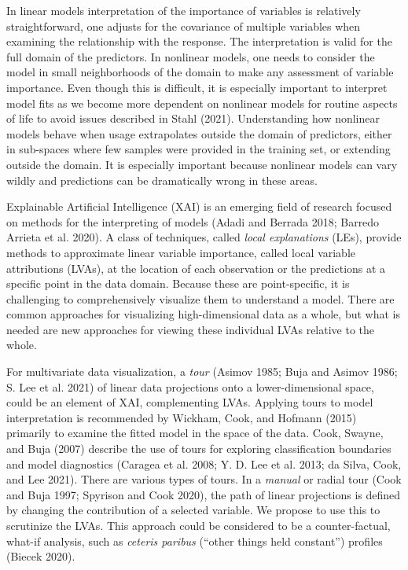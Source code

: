 \documentclass[
]{article}
\begin{document}
In linear models interpretation of the importance of variables is relatively straightforward, one adjusts for the covariance of multiple variables when examining the relationship with the response. The interpretation is valid for the full domain of the predictors. In nonlinear models, one needs to consider the model in small neighborhoods of the domain to make any assessment of variable importance. Even though this is difficult, it is especially important to interpret model fits as we become more dependent on nonlinear models for routine aspects of life to avoid issues described in Stahl (2021). Understanding how nonlinear models behave when usage extrapolates outside the domain of predictors, either in sub-spaces where few samples were provided in the training set, or extending outside the domain. It is especially important because nonlinear models can vary wildly and predictions can be dramatically wrong in these areas.

Explainable Artificial Intelligence (XAI) is an emerging field of research focused on methods for the interpreting of models (Adadi and Berrada 2018; Barredo Arrieta et al. 2020). A class of techniques, called \emph{local explanations} (LEs), provide methods to approximate linear variable importance, called local variable attributions (LVAs), at the location of each observation or the predictions at a specific point in the data domain. Because these are point-specific, it is challenging to comprehensively visualize them to understand a model. There are common approaches for visualizing high-dimensional data as a whole, but what is needed are new approaches for viewing these individual LVAs relative to the whole.

For multivariate data visualization, a \emph{tour} (Asimov 1985; Buja and Asimov 1986; S. Lee et al. 2021) of linear data projections onto a lower-dimensional space, could be an element of XAI, complementing LVAs.
Applying tours to model interpretation is recommended by Wickham, Cook, and Hofmann (2015) primarily to examine the fitted model in the space of the data. Cook, Swayne, and Buja (2007) describe the use of tours for exploring classification boundaries and model diagnostics (Caragea et al. 2008; Y. D. Lee et al. 2013; da Silva, Cook, and Lee 2021).
There are various types of tours. In a \emph{manual} or radial tour (Cook and Buja 1997; Spyrison and Cook 2020), the path of linear projections is defined by changing the contribution of a selected variable. We propose to use this to scrutinize the LVAs.
This approach could be considered to be a counter-factual, what-if analysis, such as \emph{ceteris paribus} (``other things held constant'') profiles (Biecek 2020).
\end{document}
